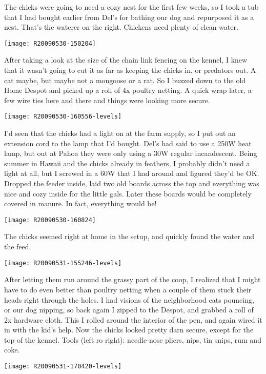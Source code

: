 The chicks were going to need a cozy nest for the first few weeks, so I
took a tub that I had bought earlier from Del's for bathing our dog and
repurposed it as a nest.  That's the waterer on the right.  Chickens
need plenty of clean water. 
\newpage

\texttt{[image: R20090530-150204]}

After taking a look at the size of the chain link fencing on the kennel,
I knew that it wasn't going to cut it as far as keeping the chicks in,
or predators out.  A cat maybe, but maybe not a mongoose or a rat.  So I
buzzed down to the old Home Despot and picked up a roll of 4x poultry
netting.  A quick wrap later, a few wire ties here and there and things
were looking more secure. 
\newpage

\texttt{[image: R20090530-160556-levels]}

I'd seen that the chicks had a light on at the farm supply, so I put out
an extension cord to the lamp that I'd bought.  Del's had said to use a
250W heat lamp, but out at Pahoa they were only using a 30W regular
incandescent.  Being summer in Hawaii and the chicks already in
feathers, I probably didn't need a light at all, but I screwed in a 60W
that I had around and figured they'd be OK.  Dropped the feeder inside,
laid two old boards across the top and everything was nice and cozy
inside for the little gals.  Later these boards would be completely
covered in manure.  In fact, everything would be! 
\newpage

\texttt{[image: R20090530-160824]}

The chicks seemed right at home in the setup, and quickly found the
water and the feed. 
\newpage

\texttt{[image: R20090531-155246-levels]}

After letting them run around the grassy part of the coop, I realized
that I might have to do even better than poultry netting when a couple
of them stuck their heads right through the holes.  I had visions of the
neighborhood cats pouncing, or our dog nipping, so back again I zipped
to the Despot, and grabbed a roll of 2x hardware cloth.  This I rolled
around the interior of the pen, and again wired it in with the kid's
help.  Now the chicks looked pretty darn secure, except for the top of
the kennel.  Tools (left ro right): needle-nose pliers, nips, tin snips,
rum and coke. 
\newpage

\texttt{[image: R20090531-170420-levels]}

